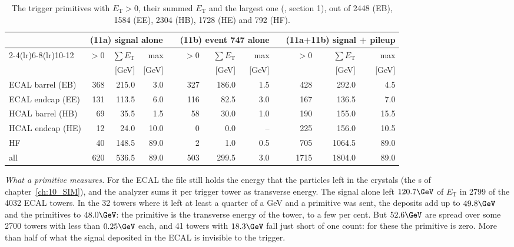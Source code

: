 \begin{table}[!htb]
\centering\small\setlength{\tabcolsep}{4pt}
\caption{The trigger primitives with $E_{\mathrm T}>0$, their summed $E_{\mathrm T}$ and the largest one
(, section 1), out of 2448 (EB), 1584 (EE), 2304 (HB), 1728 (HE) and 792 (HF).}
\label{tab:11_tp}
\begin{tabular}{l rrr c rrr c rrr}
\toprule
 & \multicolumn{3}{c}{(11a) signal alone} & & \multicolumn{3}{c}{(11b) event 747 alone} & & \multicolumn{3}{c}{(11a+11b) signal + pileup} \\
\cmidrule(lr){2-4}\cmidrule(lr){6-8}\cmidrule(lr){10-12}
 & $>0$ & $\sum E_{\mathrm T}$ & max & & $>0$ & $\sum E_{\mathrm T}$ & max & & $>0$ & $\sum E_{\mathrm T}$ & max \\
 & & [GeV] & [GeV] & & & [GeV] & [GeV] & & & [GeV] & [GeV] \\
\midrule
ECAL barrel (EB) & 368 & 215.0 & 3.0 & & 327 & 186.0 & 1.5 & & 428 & 292.0 & 4.5 \\
ECAL endcap (EE) & 131 & 113.5 & 6.0 & & 116 & 82.5 & 3.0 & & 167 & 136.5 & 7.0 \\
HCAL barrel (HB) & 69 & 35.5 & 1.5 & & 58 & 30.0 & 1.0 & & 190 & 155.0 & 15.5 \\
HCAL endcap (HE) & 12 & 24.0 & 10.0 & & 0 & 0.0 & -- & & 225 & 156.0 & 10.5 \\
HF & 40 & 148.5 & 89.0 & & 2 & 1.0 & 0.5 & & 705 & 1064.5 & 89.0 \\
\midrule
all & 620 & 536.5 & 89.0 & & 503 & 299.5 & 3.0 & & 1715 & 1804.0 & 89.0 \\
\bottomrule
\end{tabular}
\end{table}

\emph{What a primitive measures.} For the ECAL the file still holds the energy that the particles left in the
crystals (the s of chapter~\ref{ch:10_SIM}), and the analyzer sums it per trigger tower as transverse
energy. The signal alone left $120.7\GeV$ of $E_{\mathrm T}$ in 2799 of the 4032 ECAL towers. In the 32 towers where
it left at least a quarter of a GeV and a primitive was sent, the deposits add up to $49.8\GeV$ and the primitives
to $48.0\GeV$: the primitive is the transverse energy of the tower, to a few per cent. But $52.6\GeV$ are spread over
some 2700 towers with less than $0.25\GeV$ each, and 41 towers with $18.3\GeV$ fall just short of one count: for
these the primitive is zero. More than half of what the signal deposited in the ECAL is invisible to the trigger.

